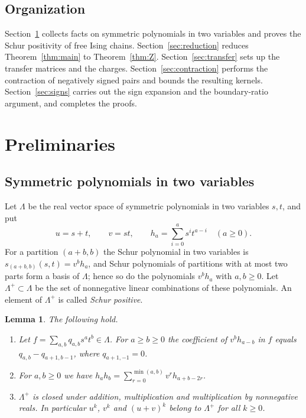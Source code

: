 \documentclass{amsart}
\newtheorem{lemma}[theorem]{Lemma}
\theoremstyle{definition}
\theoremstyle{remark}
\numberwithin{equation}{section}
\newcommand{\Lp}{\Lambda^{+}}
\begin{document}
\subsection*{Organization}
Section~\ref{sec:prelim} collects facts on symmetric polynomials in two variables and proves the Schur positivity of free Ising chains. Section~\ref{sec:reduction} reduces Theorem~\ref{thm:main} to Theorem~\ref{thm:Z}. Section~\ref{sec:transfer} sets up the transfer matrices and the charges. Section~\ref{sec:contraction} performs the contraction of negatively signed pairs and bounds the resulting kernels. Section~\ref{sec:signs} carries out the sign expansion and the boundary-ratio argument, and completes the proofs.

\section{Preliminaries}\label{sec:prelim}

\subsection{Symmetric polynomials in two variables}
Let $\Lambda$ be the real vector space of symmetric polynomials in two variables $s,t$, and put
\[
u=s+t,\qquad v=st,\qquad h_a=\sum_{i=0}^{a}s^it^{a-i}\quad(a\ge0).
\]
For a partition $(a+b,b)$ the Schur polynomial in two variables is $s_{(a+b,b)}(s,t)=v^bh_a$, and Schur polynomials of partitions with at most two parts form a basis of $\Lambda$; hence so do the polynomials $v^bh_a$ with $a,b\ge0$. Let $\Lp\subset\Lambda$ be the set of nonnegative linear combinations of these polynomials. An element of $\Lp$ is called \emph{Schur positive}.

\begin{lemma}\label{lem:schur}
The following hold.
\begin{enumerate}
\item[(a)] Let $f=\sum_{a,b}q_{a,b}s^at^b\in\Lambda$. For $a\ge b\ge0$ the coefficient of $v^bh_{a-b}$ in $f$ equals $q_{a,b}-q_{a+1,b-1}$, where $q_{a+1,-1}=0$.
\item[(b)] For $a,b\ge0$ we have $h_ah_b=\sum_{r=0}^{\min(a,b)}v^rh_{a+b-2r}$.
\item[(c)] $\Lp$ is closed under addition, multiplication and multiplication by nonnegative reals. In particular $u^k$, $v^k$ and $(u+v)^k$ belong to $\Lp$ for all $k\ge0$.
\end{enumerate}
\end{lemma}
\end{document}
